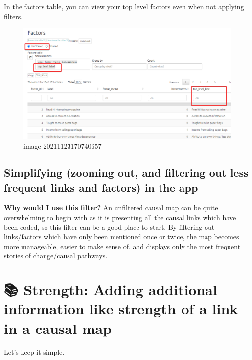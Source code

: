 \documentclass[
]{book}
\begin{document}
In the factors table, you can view your top level factors even when not applying filters.

\begin{figure}
\centering
\includegraphics{_assets/image-20211123170740657.png}
\caption{image-20211123170740657}
\end{figure}

\hypertarget{simplifying-zooming-out-and-filtering-out-less-frequent-links-and-factors-in-the-app}{%
\section{Simplifying (zooming out, and filtering out less frequent links and factors) in the app}\label{simplifying-zooming-out-and-filtering-out-less-frequent-links-and-factors-in-the-app}}

\textbf{Why would I use this filter?}
An unfiltered causal map can be quite overwhelming to begin with as it is presenting all the causal links which have been coded, so this filter can be a good place to start. By filtering out links/factors which have only been mentioned once or twice, the map becomes more manageable, easier to make sense of, and displays only the most frequent stories of change/causal pathways.

\hypertarget{strength-adding-additional-information-like-strength-of-a-link-in-a-causal-map}{%
\chapter{📚 Strength: Adding additional information like strength of a link in a causal map}\label{strength-adding-additional-information-like-strength-of-a-link-in-a-causal-map}}

Let's keep it simple.
\end{document}
